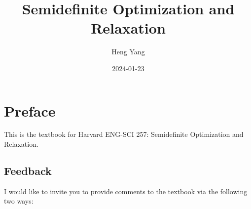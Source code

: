 \documentclass[
]{book}
\title{Semidefinite Optimization and Relaxation}
\author{Heng Yang}
\date{2024-01-23}
\theoremstyle{definition}
\theoremstyle{definition}
\theoremstyle{definition}
\theoremstyle{definition}
\theoremstyle{remark}
\begin{document}
\maketitle

{
\setcounter{tocdepth}{1}
\tableofcontents
}
\newcommand{\calQ}{\mathcal{Q}}

\newcommand{\Real}[1]{\mathbb{R}^{#1}}
\newcommand{\sym}[1]{\mathbb{S}^{#1}}
\newcommand{\psd}[1]{\sym{#1}_{+}}
\newcommand{\pd}[1]{\sym{#1}_{++}}
\newcommand{\inprod}[2]{\langle #1, #2 \rangle}
\newcommand{\linprod}[2]{\left\langle #1, #2 \right\rangle}
\newcommand{\trace}{\mathrm{tr}}
\newcommand{\tran}{^\top}

\newcommand{\rank}{\mathrm{rank}}
\newcommand{\diag}{\mathrm{diag}}
\newcommand{\Diag}{\mathrm{Diag}}
\newcommand{\BlkDiag}{\mathrm{BlkDiag}}
\newcommand{\vectorize}{\mathrm{vec}}
\newcommand{\svec}{\mathrm{svec}}
\newcommand{\mat}{\mathrm{mat}}
\newcommand{\smat}{\mathrm{smat}}
\newcommand{\norm}[1]{\Vert #1 \Vert}
\newcommand{\lnorm}[1]{\left\Vert #1 \right\Vert}
\newcommand{\pnorm}[2]{\Vert #1 \Vert_{#2}}
\newcommand{\Fnorm}[1]{\Vert #1 \Vert_\mathrm{F}}
\newcommand{\conv}{\mathrm{conv}}
\newcommand{\cone}{\mathrm{cone}}
\newcommand{\interior}{\mathrm{int}}
\newcommand{\relint}{\mathrm{ri}}
\newcommand{\poly}[1]{\mathbb{R}[#1]}
\newcommand{\SOd}{\mathrm{SO}(d)}
\newcommand{\SOthree}{\mathrm{SO}(3)}
\newcommand{\usphere}{\mathcal{S}}
\newcommand{\bmath}[1]{\boldsymbol{#1}}
\newcommand{\lbrkt}{[\![}
\newcommand{\rbrkt}{]\!]}
\newcommand{\brkt}[1]{\lbrkt #1 \rbrkt}
\newcommand{\cbrace}[1]{\{ #1 \}}
\newcommand{\lcbrace}[1]{ \left\{ #1 \right\} }
\newcommand{\aff}{\mathrm{aff}}
\newcommand{\bbN}{\mathbb{N}}
\newcommand{\dist}{\mathrm{dist}}
\newcommand{\subject}{\mathrm{s.t.}}

\hypertarget{preface}{%
\chapter*{Preface}\label{preface}}

This is the textbook for Harvard ENG-SCI 257: Semidefinite Optimization and Relaxation.

\hypertarget{feedback}{%
\section*{Feedback}\label{feedback}}

I would like to invite you to provide comments to the textbook via the following two ways:
\end{document}
